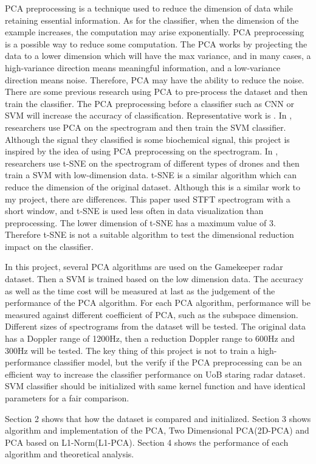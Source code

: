 \documentclass{cta-author}
\begin{document}
PCA preprocessing is a technique used to reduce the dimension of data while retaining essential information. As for the classifier, when the dimension of the example increases, the computation may arise exponentially. PCA preprocessing is a possible way to reduce some computation. 
The PCA works by projecting the data to a lower dimension which will have the max variance, and in many cases, a high-variance direction means meaningful information, and a low-variance direction means noise.
Therefore, PCA may have the ability to reduce the noise. There are some previous research using PCA to pre-process the dataset and then train the classifier. The PCA preprocessing before a classifier such as CNN or SVM  will increase the accuracy of classification. Representative work is \cite{20}. 
In \cite{21}, researchers use PCA on the spectrogram and then train the SVM classifier. Although the signal they classified is some biochemical signal, this project is inspired by the idea of using PCA preprocessing on the spectrogram.
In \cite{22}, researchers use t-SNE on the spectrogram of different types of drones and then train a SVM with low-dimension data. t-SNE is a similar algorithm which can reduce the dimension of the original dataset. Although this is a similar work to my project, there are differences. This paper used STFT spectrogram with a short window, and t-SNE is used less often in data visualization than preprocessing. The lower dimension of t-SNE has a maximum value of 3. 
Therefore t-SNE is not a suitable algorithm to test the dimensional reduction impact on the classifier.

In this project, several PCA algorithms are used on the Gamekeeper radar dataset. Then a SVM is trained based on the low dimension data. The accuracy as well as the time cost will be measured at last as the judgement of the performance of the PCA algorithm. For each PCA algorithm, performance will be measured against different coefficient of PCA, such as the subspace dimension. Different sizes of spectrograms from the dataset will be tested. The original data has a Doppler range of 1200Hz, then a reduction Doppler range to 600Hz and 300Hz will be tested. 
The key thing of this project is not to train a high-performance classifier model, but the verify if the PCA preprocessing can be an efficient way to increase the classifier performance on UoB staring radar dataset. SVM classifier should be initialized with same kernel function and have identical parameters for a fair comparison.

Section 2 shows that how the dataset is compared and initialized. Section 3 shows algorithm and implementation of the PCA, Two Dimensional PCA(2D-PCA) and PCA based on L1-Norm(L1-PCA). Section 4 shows the performance of each algorithm and theoretical analysis.
\end{document}
